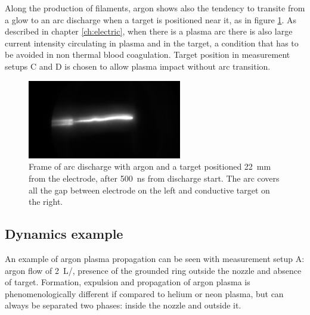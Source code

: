Along the production of filaments, argon shows also the tendency to transite from a glow to an arc discharge when a target is positioned near it, as in figure \ref{fig:arcex}. As described in chapter \ref{ch:electric}, when there is a plasma arc there is also large current intensity circulating in plasma and in the target, a condition that has to be avoided in non thermal blood coagulation. Target position in measurement setups C and D is chosen to allow plasma impact without arc transition.
\begin{figure}
 \centering
 \includegraphics[width=0.6\textwidth]{Images/Shape/arcex.png}
 \caption{Frame of arc discharge with argon and a target positioned \SI{22}{\milli\meter} from the electrode, after \SI{500}{\nano\second} from discharge start. The arc covers all the gap between electrode on the left and conductive target on the right.}
 \label{fig:arcex}
\end{figure}

\subsection{Dynamics example}
An example of argon plasma propagation can be seen with measurement setup A: argon flow of \SI{2}{\liter/\min}, presence of the grounded ring outside the nozzle and absence of target.
Formation, expulsion and propagation of argon plasma is phenomenologically different if compared to helium or neon plasma, but can always be separated two phases: inside the nozzle and outside it.

